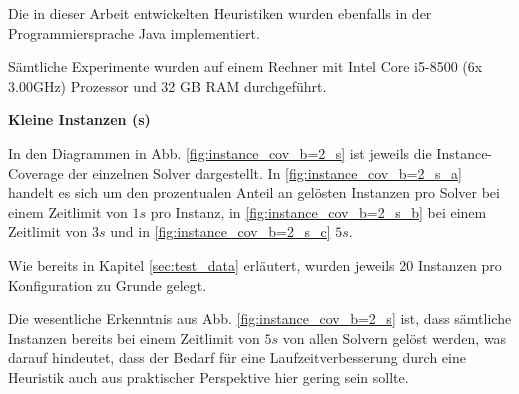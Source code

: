 Die in dieser Arbeit entwickelten Heuristiken wurden ebenfalls in der Programmiersprache Java implementiert.

Sämtliche Experimente wurden auf einem Rechner mit Intel Core i5-8500 (6x 3.00GHz) Prozessor und 32 GB RAM durchgeführt.

\pagebreak

\textbf{Kleine Instanzen (s)}

In den Diagrammen in Abb. \ref{fig:instance_cov_b=2_s} ist jeweils die Instance-Coverage der einzelnen Solver dargestellt.
In \ref{fig:instance_cov_b=2_s_a} handelt es sich um den prozentualen Anteil an gelösten Instanzen pro Solver bei einem Zeitlimit
von $1s$ pro Instanz, in \ref{fig:instance_cov_b=2_s_b} bei einem Zeitlimit von $3s$ und in \ref{fig:instance_cov_b=2_s_c} $5s$.

Wie bereits in Kapitel \ref{sec:test_data} erläutert, wurden jeweils 20 Instanzen pro Konfiguration zu Grunde gelegt.

Die wesentliche Erkenntnis aus Abb. \ref{fig:instance_cov_b=2_s} ist, dass sämtliche Instanzen bereits bei einem Zeitlimit von $5s$
von allen Solvern gelöst werden, was darauf hindeutet, dass der Bedarf für eine Laufzeitverbesserung durch eine Heuristik auch
aus praktischer Perspektive hier gering sein sollte.

